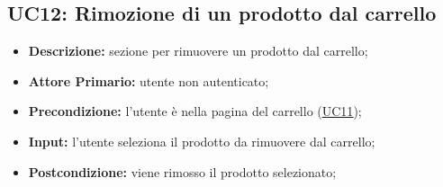 
\subsection{UC12: Rimozione di un prodotto dal carrello}
\label{sec:UC12}
\begin{itemize}
    \item \textbf{Descrizione:} sezione per rimuovere un prodotto dal carrello;
    \item \textbf{Attore Primario:} utente non autenticato;
    \item \textbf{Precondizione:} l'utente è nella pagina del carrello (\hyperref[sec:UC11]{\underline{UC11}});
    \item \textbf{Input:} l'utente seleziona il prodotto da rimuovere dal carrello;
    \item \textbf{Postcondizione:} viene rimosso il prodotto selezionato;
\end{itemize}